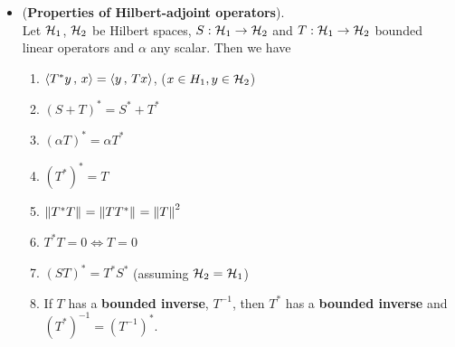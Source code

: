 \documentclass[11pt]{article}
\begin{document}
\begin{itemize}
\item \begin{proposition} (\textbf{Properties of Hilbert-adjoint operators}).  \citep{reed1980methods, kreyszig1989introductory}\\
Let ${\mathcal H}_1$, ${\mathcal H}_2$ be Hilbert spaces, $S: {\mathcal H}_1 \rightarrow {\mathcal H}_2$ and $T: {\mathcal H}_1 \rightarrow {\mathcal H}_2$ bounded linear operators and $\alpha$ any scalar. Then we have
\begin{enumerate}
\item $\left\langle T^{*}y\,,\, x \right\rangle = \left\langle y\,,\, Tx \right\rangle$,  ($x \in H_1,  y \in {\mathcal H}_2$)
\item $ (S + T)^{*} = S^{*} + T^{*}$
\item $(\alpha T)^{*} = \alpha T^{*}$
\item $(T^{*})^{*} = T$
\item $\left\|T^{*}T\right\|_{} = \left\|TT^{*}\right\|_{} = \left\|T\right\|_{}^2$
\item $T^{*}T =0 \Leftrightarrow T=0$
\item $(ST)^{*}= T^{*}S^{*}$  (assuming ${\mathcal H}_2 = {\mathcal H}_1$)
\item If $T$ has a \textbf{bounded inverse},  $T^{-1}$, then $T^*$ has a \textbf{bounded inverse} and $(T^{*})^{-1} = (T^{-1})^{*}$.
\end{enumerate}
\end{proposition}
\end{itemize}
\end{document}
